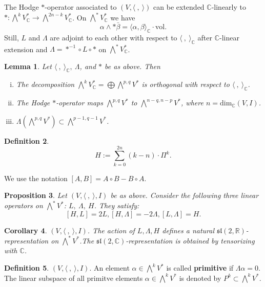 \documentclass{article}
\theoremstyle{definition}
\newtheorem{definition}{Definition}[subsection]
\theoremstyle{plain}
\newtheorem{lemma}[definition]{Lemma}
\newtheorem{corollary}[definition]{Corollary}
\newtheorem{proposition}[definition]{Proposition}
\begin{document}
The Hodge $ * $-operator associated to $ (V,\langle\ ,\ \rangle) $ can be extended $ \mathbb{C} $-linearly to $ *:\bigwedge^k V_{\mathbb{C}}^*\rightarrow\bigwedge^{2n-k}V_{\mathbb{C}}^* $. On $ \bigwedge^* V_{\mathbb{C}}^* $ we have\[
    \alpha\wedge*\bar{\beta}=\langle\alpha,\beta\rangle_{\mathbb{C}}\cdot\mathrm{vol}.
\]Still, $ L $ and $ \varLambda $ are adjoint to each other with respect to $ \langle\ ,\ \rangle_{\mathbb{C}} $ after $ \mathbb{C} $-linear extension and $ \varLambda=*^{-1}\circ L\circ * $ on $ \bigwedge^* V_{\mathbb{C}}^* $.

\begin{lemma}
    Let $ \langle\ ,\ \rangle_{\mathbb{C}},\ \varLambda $, and $ * $ be as above. Then
    \begin{enumerate}[(i)]
        \item The decomposition $ \bigwedge^k V_{\mathbb{C}}^*=\bigoplus\bigwedge^{p,q}V^* $ is orthogonal with respect to $ \langle\ ,\ \rangle_{\mathbb{C}} $.
        \item The Hodge $ * $-operator maps $ \bigwedge^{p,q}V^* $ to $ \bigwedge^{n-q,n-p}V^* $, where $ n=\mathrm{dim}_{\mathbb{C}}(V,I) $.
        \item $ \varLambda(\bigwedge^{p,q}V^*)\subset\bigwedge^{p-1,q-1}V^* $.
    \end{enumerate}
\end{lemma}

\begin{definition}
    \[
        H:=\sum_{k=0}^{2n}(k-n)\cdot\varPi^k.
    \]
\end{definition}

We use the notation $ [A,B]=A\circ B-B\circ A $.

\begin{proposition}
    Let $ (V,\langle\ ,\ \rangle,I) $ be as above. Consider the following three linear operators on $ \bigwedge^* V^* $: $ L,\ \varLambda,\ H $. They satisfy:\[
        [H,L]=2L,[H,\varLambda]=-2\varLambda,[L,\varLambda]=H.
    \]
\end{proposition}

\begin{corollary}
    $ (V,\langle\ ,\ \rangle,I) $. The action of $ L,\varLambda,H $ defines a natural $ \mathfrak{sl}(2,\mathbb{R}) $-representation on $ \bigwedge^* V^* $.The $ \mathfrak{sl}(2,\mathbb{C}) $-representation is obtained by tensorizing with $ \mathbb{C} $.
\end{corollary}

\begin{definition}
    $ (V,\langle\ ,\ \rangle,I) $. An element $ \alpha\in\bigwedge^k V^* $ is called \textbf{primitive} if $ \varLambda\alpha=0 $. The linear subspace of all primitve elements $ \alpha\in\bigwedge^k V^* $ is denoted by $ P^k\subset\bigwedge^k V^* $.
\end{definition}
\end{document}
